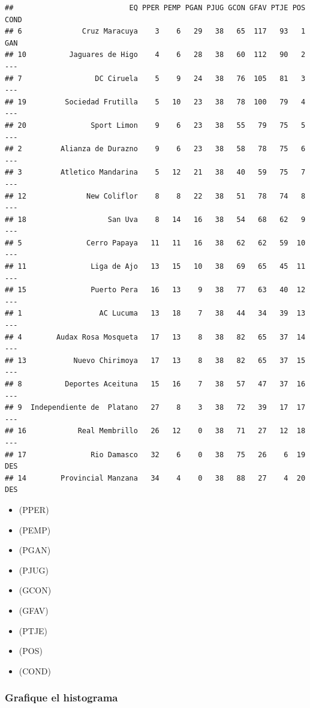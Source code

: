 \documentclass[]{article}
\providecommand{\tightlist}{%
  \setlength{\itemsep}{0pt}\setlength{\parskip}{0pt}}
\begin{document}
\begin{verbatim}
##                           EQ PPER PEMP PGAN PJUG GCON GFAV PTJE POS COND
## 6              Cruz Maracuya    3    6   29   38   65  117   93   1  GAN
## 10          Jaguares de Higo    4    6   28   38   60  112   90   2  ---
## 7                 DC Ciruela    5    9   24   38   76  105   81   3  ---
## 19         Sociedad Frutilla    5   10   23   38   78  100   79   4  ---
## 20               Sport Limon    9    6   23   38   55   79   75   5  ---
## 2         Alianza de Durazno    9    6   23   38   58   78   75   6  ---
## 3         Atletico Mandarina    5   12   21   38   40   59   75   7  ---
## 12              New Coliflor    8    8   22   38   51   78   74   8  ---
## 18                   San Uva    8   14   16   38   54   68   62   9  ---
## 5               Cerro Papaya   11   11   16   38   62   62   59  10  ---
## 11               Liga de Ajo   13   15   10   38   69   65   45  11  ---
## 15               Puerto Pera   16   13    9   38   77   63   40  12  ---
## 1                  AC Lucuma   13   18    7   38   44   34   39  13  ---
## 4        Audax Rosa Mosqueta   17   13    8   38   82   65   37  14  ---
## 13           Nuevo Chirimoya   17   13    8   38   82   65   37  15  ---
## 8          Deportes Aceituna   15   16    7   38   57   47   37  16  ---
## 9  Independiente de  Platano   27    8    3   38   72   39   17  17  ---
## 16            Real Membrillo   26   12    0   38   71   27   12  18  ---
## 17               Rio Damasco   32    6    0   38   75   26    6  19  DES
## 14        Provincial Manzana   34    4    0   38   88   27    4  20  DES
\end{verbatim}

\begin{itemize}
\tightlist
\item
  (PPER)
\item
  (PEMP)
\item
  (PGAN)
\item
  (PJUG)
\item
  (GCON)
\item
  (GFAV)
\item
  (PTJE)
\item
  (POS)
\item
  (COND)
\end{itemize}

\hypertarget{grafique-el-histograma}{%
\subsubsection{Grafique el histograma}\label{grafique-el-histograma}}
\end{document}
